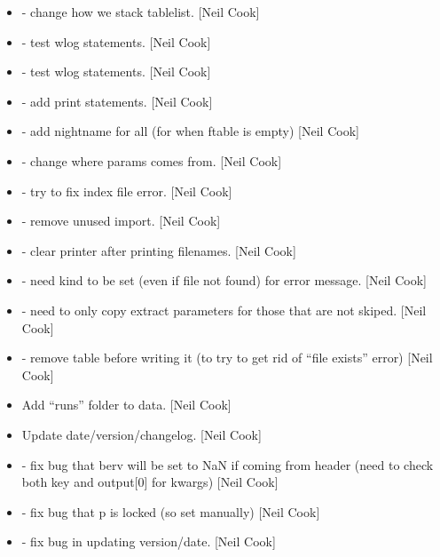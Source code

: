 \documentclass[a4paper,10pt,english]{report}
\begin{document}
\begin{itemize}
\item {} 
 - change how we stack tablelist. {[}Neil Cook{]}

\item {} 
 - test wlog statements. {[}Neil Cook{]}

\item {} 
 - test wlog statements. {[}Neil Cook{]}

\item {} 
 - add print statements. {[}Neil Cook{]}

\item {} 
 - add nightname for all (for when
ftable is empty) {[}Neil Cook{]}

\item {} 
 - change where params comes
from. {[}Neil Cook{]}

\item {} 
 - try to fix index file error. {[}Neil Cook{]}

\item {} 
 - remove unused import. {[}Neil Cook{]}

\item {} 
 - clear printer after printing filenames.
{[}Neil Cook{]}

\item {} 
 - need kind to be set (even if
file not found) for error message. {[}Neil Cook{]}

\item {} 
 - need to only copy extract parameters for
those that are not skiped. {[}Neil Cook{]}

\item {} 
 - remove table before writing it (to try to get rid of
“file exists” error) {[}Neil Cook{]}

\item {} 
Add “runs” folder to data. {[}Neil Cook{]}

\item {} 
Update date/version/changelog. {[}Neil Cook{]}

\item {} 
 - fix bug that berv will be set to NaN if
coming from header (need to check both key and output{[}0{]} for kwargs)
{[}Neil Cook{]}

\item {} 
 - fix bug that p is locked
(so set manually) {[}Neil Cook{]}

\item {} 
 - fix bug in updating version/date. {[}Neil Cook{]}

\end{itemize}
\end{document}
